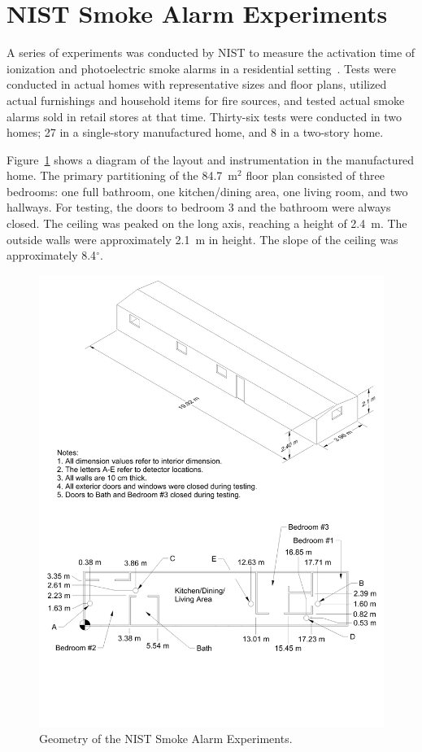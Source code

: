 \section{NIST Smoke Alarm Experiments}

A series of experiments was conducted by NIST to measure the activation time of ionization and photoelectric
smoke alarms in a residential setting~\cite{Bukowski:1}. Tests were conducted in actual homes with
representative sizes and floor plans, utilized actual furnishings and household items for fire sources,
and tested actual smoke alarms sold in retail stores at that time. Thirty-six tests were conducted in two
homes; 27 in a single-story manufactured home, and 8 in a two-story home.

Figure~\ref{NIST_Dunes_2000_Drawing} shows a diagram of the layout and instrumentation in the
manufactured home. The primary partitioning of the 84.7~m$^2$ floor plan consisted of three bedrooms:
one full bathroom, one kitchen/dining area, one living room, and two hallways. For testing, the doors
to bedroom 3 and the bathroom were always closed. The ceiling
was peaked on the long axis, reaching a height of 2.4~m. The outside walls
were approximately 2.1~m in height. The slope of the ceiling was approximately 8.4$^\circ$.

\begin{figure}
\begin{center}
\includegraphics[width=6.5in]{FIGURES/NIST_Dunes_2000/Manufactured_Home_Drawing}
\end{center}
\caption[Geometry of the NIST Dunes 2000 Experiments]{Geometry of the NIST Smoke Alarm Experiments.}
\label{NIST_Dunes_2000_Drawing}
\end{figure}

